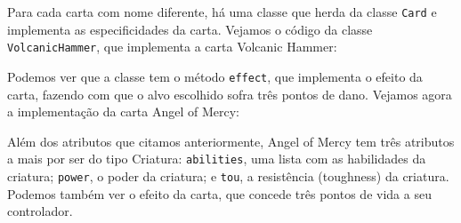 \documentclass[dvipsnames]{book}
\begin{document}
Para cada carta com nome diferente, há uma classe que herda da classe \texttt{Card} e implementa
as especificidades da carta. Vejamos o código da classe \texttt{VolcanicHammer}, que implementa
a carta Volcanic Hammer:
\begin{figure}
  
\end{figure}
Podemos ver que a classe tem o método \texttt{effect}, que implementa o efeito da carta,
fazendo com que o alvo escolhido sofra três pontos de dano. Vejamos agora a implementação
da carta Angel of Mercy:
\begin{figure}
  
\end{figure}
Além dos atributos que citamos anteriormente, Angel of Mercy tem três atributos a mais por
ser do tipo Criatura: \texttt{abilities}, uma lista com as habilidades da criatura;
\texttt{power}, o poder da criatura; e \texttt{tou}, a resistência (toughness) da criatura.
Podemos também ver o efeito da carta, que concede três pontos de vida a seu controlador.
\end{document}

